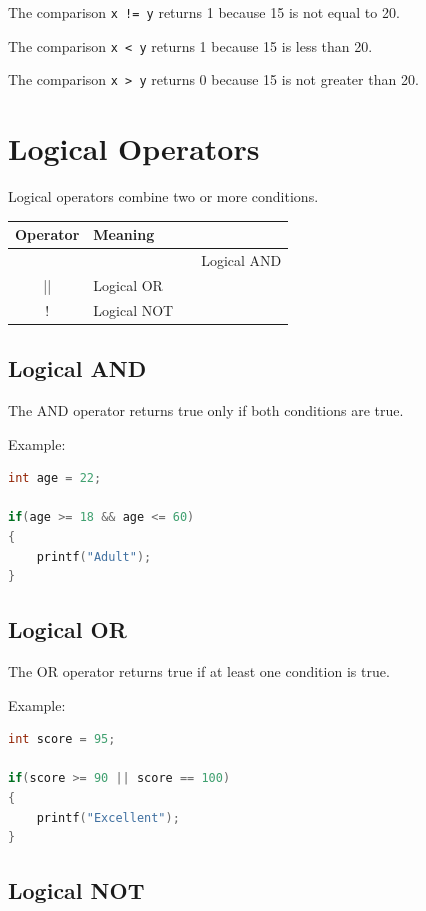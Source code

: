 \documentclass[12pt,openany]{book}
\begin{document}
The comparison \texttt{x != y} returns 1 because 15 is not equal to 20.

The comparison \texttt{x < y} returns 1 because 15 is less than 20.

The comparison \texttt{x > y} returns 0 because 15 is not greater than 20.

\section{Logical Operators}

Logical operators combine two or more conditions.

\begin{center}
\begin{tabular}{|c|l|}
\hline
\textbf{Operator} & \textbf{Meaning} \\
\hline
&& & Logical AND \\
|| & Logical OR \\
! & Logical NOT \\
\hline
\end{tabular}
\end{center}

\subsection{Logical AND}

The AND operator returns true only if both conditions are true.

Example:

\begin{lstlisting}[language=C]
int age = 22;

if(age >= 18 && age <= 60)
{
    printf("Adult");
}
\end{lstlisting}

\subsection{Logical OR}

The OR operator returns true if at least one condition is true.

Example:

\begin{lstlisting}[language=C]
int score = 95;

if(score >= 90 || score == 100)
{
    printf("Excellent");
}
\end{lstlisting}

\subsection{Logical NOT}
\end{document}
